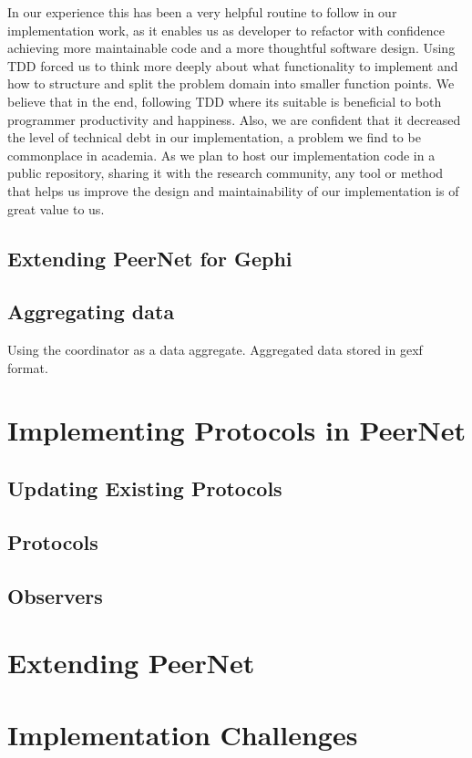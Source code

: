 \documentclass[UKenglish, a4paper]{ifimaster}
\begin{document}
        In our experience this has been a very helpful routine to follow
        in our implementation work, as it enables us as developer to
        refactor with confidence achieving more maintainable code and a
        more thoughtful software design. Using TDD forced us to think
        more deeply about what functionality to implement and how to
        structure and split the problem domain into smaller function
        points. We believe that in the end, following TDD where its
        suitable is beneficial to both programmer productivity and
        happiness. Also, we are confident that it decreased the level of
        technical debt in our implementation, a problem we find to be
        commonplace in academia. As we plan to host our implementation
        code in a public repository, sharing it with the research
        community, any tool or method that helps us improve the design
        and maintainability of our implementation is of great value to
        us.

        \subsection{Extending PeerNet for Gephi}
        \subsection{Aggregating data}
            Using the coordinator as a data aggregate. Aggregated data
            stored in gexf format.
    \section{Implementing Protocols in PeerNet}
        \subsection{Updating Existing Protocols}
        \subsection{Protocols}
        \subsection{Observers}
    \section{Extending PeerNet}
    \section{Implementation Challenges}
\end{document}
